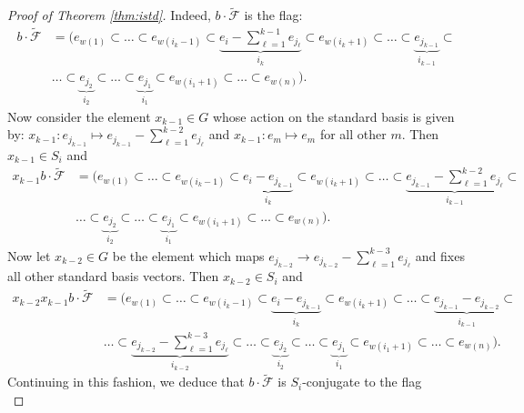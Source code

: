 \documentclass[12pt]{amsart}
\numberwithin{equation}{section}
\theoremstyle{remark}
\theoremstyle{definition}
\newcommand{\F}{\mathcal{F}}
\begin{document}
\begin{proof}[Proof of Theorem \ref{thm:istd}]
Indeed, $b\cdot\tilde{\F}$ is the flag: 
\begin{equation*}
\begin{split}
b\cdot\tilde{\F}&=(e_{w(1)}\subset\dots\subset e_{w(i_{k}-1)}\subset\underbrace{ e_{i}-\sum_{\ell=1}^{k-1} e_{j_{\ell}}}_{i_{k}}\subset e_{w(i_{k}+1)}\subset \dots \subset \underbrace{e_{j_{k-1}}}_{i_{k-1}}\subset\\
& \dots \subset \underbrace{e_{j_{2}}}_{i_{2}}\subset \dots\subset  \underbrace{e_{j_{1}}}_{i_{1}}\subset e_{w(i_{1}+1)}\subset \dots\subset e_{w(n)}).
\end{split}
\end{equation*}
Now consider the element $x_{k-1}\in G$ whose action on the standard basis is given by:
$x_{k-1}: e_{j_{k-1}}\mapsto e_{j_{k-1}}-\sum_{\ell=1}^{k-2} e_{j_{\ell}}$ and $x_{k-1}: e_{m}\mapsto e_{m}$ for all other $m$.  Then $x_{k-1}\in S_{i}$ and 
\begin{equation*}
\begin{split}
x_{k-1}b\cdot\tilde{\F}
&=(e_{w(1)}\subset\dots\subset e_{w(i_{k}-1)}\subset\underbrace{ e_{i}-e_{j_{k-1}}}_{i_{k}}\subset e_{w(i_{k}+1)}\subset \dots \subset \underbrace{e_{j_{k-1}}-\sum_{\ell=1}^{k-2} e_{j_{\ell}}}_{i_{k-1}}\subset\\& \dots \subset \underbrace{e_{j_{2}}}_{i_{2}}\subset \dots\subset \underbrace{e_{j_{1}}}_{i_{1}}\subset e_{w(i_{1}+1)}\subset \dots\subset e_{w(n)}).
\end{split}
\end{equation*}
Now let $x_{k-2}\in G$ be the element which maps $e_{j_{k-2}}\to e_{j_{k-2}}-\sum_{\ell=1}^{k-3} e_{j_{\ell}}$ and fixes all other standard basis vectors.
Then $x_{k-2}\in S_{i}$ and 
\begin{equation*}
\begin{split}
x_{k-2}x_{k-1}b\cdot\tilde{\F}
&=(e_{w(1)}\subset\dots\subset e_{w(i_{k}-1)}\subset\underbrace{ e_{i}-e_{j_{k-1}}}_{i_{k}}\subset e_{w(i_{k}+1)}\subset \dots \subset \underbrace{e_{j_{k-1}}-e_{j_{k-2}}}_{i_{k-1}}\subset\\
&\dots\subset\underbrace{e_{j_{k-2}}-\sum_{\ell=1}^{k-3} e_{j_{\ell}}}_{i_{k-2}}\subset  \dots \subset \underbrace{e_{j_{2}}}_{i_{2}}\subset \dots\subset \underbrace{e_{j_{1}}}_{i_{1}}\subset  e_{w(i_{1}+1)}\subset \dots\subset e_{w(n)}).
\end{split}
\end{equation*}
Continuing in this fashion, we deduce that $b\cdot{\tilde{\F}}$ is $S_{i}$-conjugate to the flag 
\begin{equation*}

\end{equation*}
\end{proof}
\end{document}
